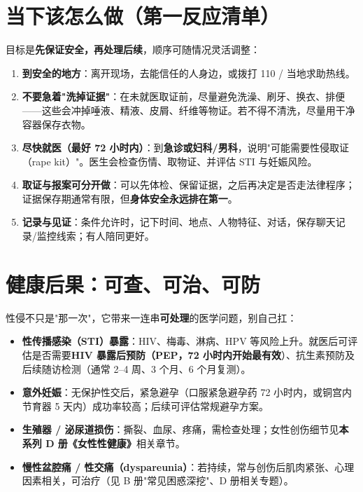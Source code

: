 \section{当下该怎么做（第一反应清单）}
目标是\textbf{先保证安全，再处理后续}，顺序可随情况灵活调整：
\begin{enumerate}
  \item \textbf{到安全的地方}：离开现场，去能信任的人身边，或拨打 110 / 当地求助热线。
  \item \textbf{不要急着"洗掉证据"}：在未就医取证前，尽量避免洗澡、刷牙、换衣、排便——这些会冲掉唾液、精液、皮屑、纤维等物证。若不得不清洗，尽量用干净容器保存衣物。
  \item \textbf{尽快就医（最好 72 小时内）}：到\textbf{急诊或妇科/男科}，说明"可能需要性侵取证（rape kit）"。医生会检查伤情、取物证、并评估 STI 与妊娠风险。
  \item \textbf{取证与报案可分开做}：可以先体检、保留证据，之后再决定是否走法律程序；证据保存期通常有限，但\textbf{身体安全永远排在第一}。
  \item \textbf{记录与见证}：条件允许时，记下时间、地点、人物特征、对话，保存聊天记录/监控线索；有人陪同更好。
\end{enumerate}

\section{健康后果：可查、可治、可防}
性侵不只是"那一次"，它带来一连串\textbf{可处理}的医学问题，别自己扛：
\begin{itemize}
  \item \textbf{性传播感染（STI）暴露}：HIV、梅毒、淋病、HPV 等风险上升。就医后可评估是否需要\textbf{HIV 暴露后预防（PEP，72 小时内开始最有效}）、抗生素预防及后续随访检测（通常 2--4 周、3 个月、6 个月复测）。
  \item \textbf{意外妊娠}：无保护性交后，紧急避孕（口服紧急避孕药 72 小时内，或铜宫内节育器 5 天内）成功率较高；后续可评估常规避孕方案。
  \item \textbf{生殖器 / 泌尿道损伤}：撕裂、血尿、疼痛，需检查处理；女性创伤细节见\textbf{本系列 D 册《女性性健康》}相关章节。
  \item \textbf{慢性盆腔痛 / 性交痛（dyspareunia）}：若持续，常与创伤后肌肉紧张、心理因素相关，可治疗（见 B 册"常见困惑深挖"、D 册相关专题）。
\end{itemize}

